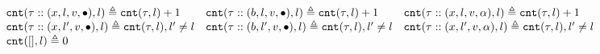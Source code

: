 \[
\begin{array}{lll}
\mathtt{cnt}(\mathtt{\tau} :: (x, l, v, \bullet), l ) \triangleq \mathtt{cnt}(\mathtt{\tau}, l) + 1
&
\mathtt{cnt}(\mathtt{\tau}  ::(b, l, v, \bullet), l) \triangleq \mathtt{cnt}(\mathtt{\tau}, l) + 1
&
\mathtt{cnt}(\mathtt{\tau}  :: (x, l, v, \alpha), l) \triangleq \mathtt{cnt}(\mathtt{\tau}, l) + 1
\\
\mathtt{cnt}(\mathtt{\tau}  :: (x, l', v, \bullet), l) \triangleq \mathtt{cnt}(\mathtt{\tau}, l), l' \neq l
&
\mathtt{cnt}(\mathtt{\tau}  :: (b, l', v, \bullet), l) \triangleq \mathtt{cnt}(\mathtt{\tau}, l), l' \neq l
&
\mathtt{cnt}(\mathtt{\tau}  :: (x, l', v, \alpha), l) \triangleq \mathtt{cnt}(\mathtt{\tau}, l), l' \neq l
\\
\mathtt{cnt}({[]}, l) \triangleq 0
&&
\end{array}
\]
%
%
